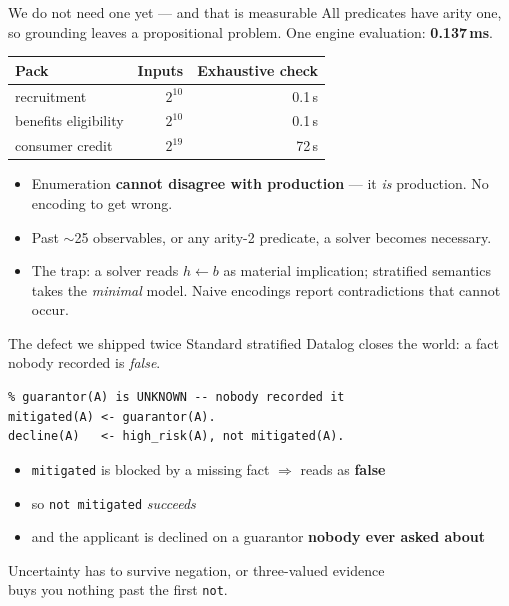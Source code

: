 \documentclass[aspectratio=169,11pt]{beamer}
\begin{document}
\begin{frame}{We do not need one yet --- and that is measurable}
  \vspace{.3em}
  All predicates have arity one, so grounding leaves a propositional problem.
  One engine evaluation: \textbf{0.137\,ms}.
  \vspace{.5em}
  \begin{center}
  \begin{tabular}{lrr}
    \toprule
    \textbf{Pack} & \textbf{Inputs} & \textbf{Exhaustive check} \\
    \midrule
    recruitment          & $2^{10}$ & 0.1\,s \\
    benefits eligibility & $2^{10}$ & 0.1\,s \\
    consumer credit      & $2^{19}$ & 72\,s \\
    \bottomrule
  \end{tabular}
  \end{center}
  \vspace{.6em}
  \pause
  \begin{itemize}
    \setlength\itemsep{.45em}
    \item Enumeration \textbf{cannot disagree with production} --- it \emph{is}
      production. No encoding to get wrong.
    \item Past $\sim$25 observables, or any arity-2 predicate, a solver becomes
      necessary.
    \item The trap: a solver reads $h \leftarrow b$ as material implication;
      stratified semantics takes the \emph{minimal} model. Naive encodings
      report contradictions that cannot occur.
  \end{itemize}
\end{frame}

\begin{frame}[fragile]{The defect we shipped twice}
  \vspace{.8em}
  Standard stratified Datalog closes the world: a fact nobody recorded is
  \emph{false}.
  \vspace{1em}
\begin{lstlisting}
% guarantor(A) is UNKNOWN -- nobody recorded it
mitigated(A) <- guarantor(A).
decline(A)   <- high_risk(A), not mitigated(A).
\end{lstlisting}
  \vspace{.3em}
  \begin{itemize}
    \setlength\itemsep{.5em}
    \item \texttt{mitigated} is blocked by a missing fact $\Rightarrow$ reads as
      \textbf{false}
    \item so \texttt{not mitigated} \emph{succeeds}
    \item and the applicant is declined on a guarantor \textbf{nobody ever
      asked about}
  \end{itemize}
  \vspace{1em}
  \pause
  \begin{center}\color{pinedark}
    Uncertainty has to survive negation, or three-valued evidence\\
    buys you nothing past the first \texttt{not}.
  \end{center}
\end{frame}
\end{document}
